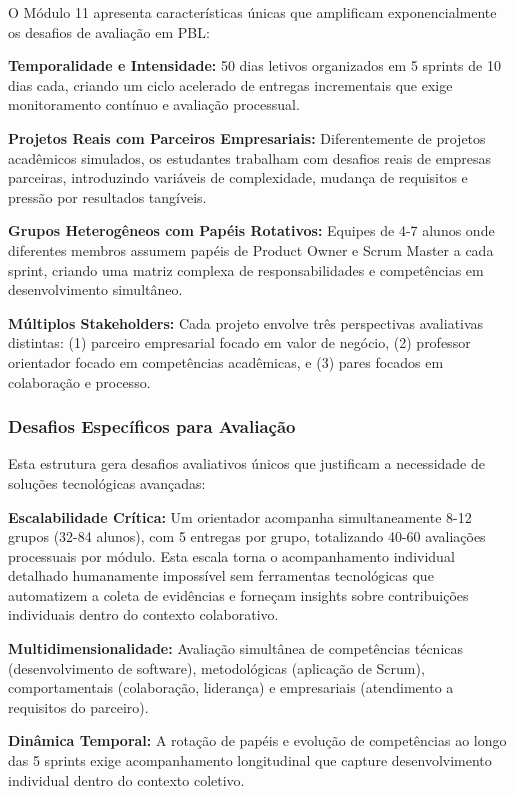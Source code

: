 \documentclass[english, spanish, brazilian]{RBIEarticle} %
\begin{document}
O Módulo 11 apresenta características únicas que amplificam exponencialmente os desafios de avaliação em PBL:

\textbf{Temporalidade e Intensidade:} 50 dias letivos organizados em 5 sprints de 10 dias cada, criando um ciclo acelerado de entregas incrementais que exige monitoramento contínuo e avaliação processual.

\textbf{Projetos Reais com Parceiros Empresariais:} Diferentemente de projetos acadêmicos simulados, os estudantes trabalham com desafios reais de empresas parceiras, introduzindo variáveis de complexidade, mudança de requisitos e pressão por resultados tangíveis.

\textbf{Grupos Heterogêneos com Papéis Rotativos:} Equipes de 4-7 alunos onde diferentes membros assumem papéis de Product Owner e Scrum Master a cada sprint, criando uma matriz complexa de responsabilidades e competências em desenvolvimento simultâneo.

\textbf{Múltiplos Stakeholders:} Cada projeto envolve três perspectivas avaliativas distintas: (1) parceiro empresarial focado em valor de negócio, (2) professor orientador focado em competências acadêmicas, e (3) pares focados em colaboração e processo.

\subsubsection{Desafios Específicos para Avaliação}

Esta estrutura gera desafios avaliativos únicos que justificam a necessidade de soluções tecnológicas avançadas:

\textbf{Escalabilidade Crítica:} Um orientador acompanha simultaneamente 8-12 grupos (32-84 alunos), com 5 entregas por grupo, totalizando 40-60 avaliações processuais por módulo. Esta escala torna o acompanhamento individual detalhado humanamente impossível sem ferramentas tecnológicas que automatizem a coleta de evidências e forneçam insights sobre contribuições individuais dentro do contexto colaborativo.

\textbf{Multidimensionalidade:} Avaliação simultânea de competências técnicas (desenvolvimento de software), metodológicas (aplicação de Scrum), comportamentais (colaboração, liderança) e empresariais (atendimento a requisitos do parceiro).

\textbf{Dinâmica Temporal:} A rotação de papéis e evolução de competências ao longo das 5 sprints exige acompanhamento longitudinal que capture desenvolvimento individual dentro do contexto coletivo.
\end{document}
